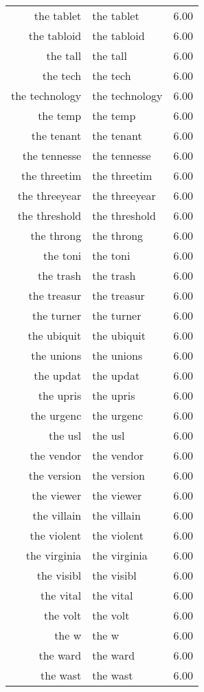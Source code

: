 \begin{table}[ht]
\begin{tabular}{rlr}
  the tablet & the tablet & 6.00 \\ 
  the tabloid & the tabloid & 6.00 \\ 
  the tall & the tall & 6.00 \\ 
  the tech & the tech & 6.00 \\ 
  the technology & the technology & 6.00 \\ 
  the temp & the temp & 6.00 \\ 
  the tenant & the tenant & 6.00 \\ 
  the tennesse & the tennesse & 6.00 \\ 
  the threetim & the threetim & 6.00 \\ 
  the threeyear & the threeyear & 6.00 \\ 
  the threshold & the threshold & 6.00 \\ 
  the throng & the throng & 6.00 \\ 
  the toni & the toni & 6.00 \\ 
  the trash & the trash & 6.00 \\ 
  the treasur & the treasur & 6.00 \\ 
  the turner & the turner & 6.00 \\ 
  the ubiquit & the ubiquit & 6.00 \\ 
  the unions & the unions & 6.00 \\ 
  the updat & the updat & 6.00 \\ 
  the upris & the upris & 6.00 \\ 
  the urgenc & the urgenc & 6.00 \\ 
  the usl & the usl & 6.00 \\ 
  the vendor & the vendor & 6.00 \\ 
  the version & the version & 6.00 \\ 
  the viewer & the viewer & 6.00 \\ 
  the villain & the villain & 6.00 \\ 
  the violent & the violent & 6.00 \\ 
  the virginia & the virginia & 6.00 \\ 
  the visibl & the visibl & 6.00 \\ 
  the vital & the vital & 6.00 \\ 
  the volt & the volt & 6.00 \\ 
  the w & the w & 6.00 \\ 
  the ward & the ward & 6.00 \\ 
  the wast & the wast & 6.00 \\ 

\end{tabular}
\end{table}
